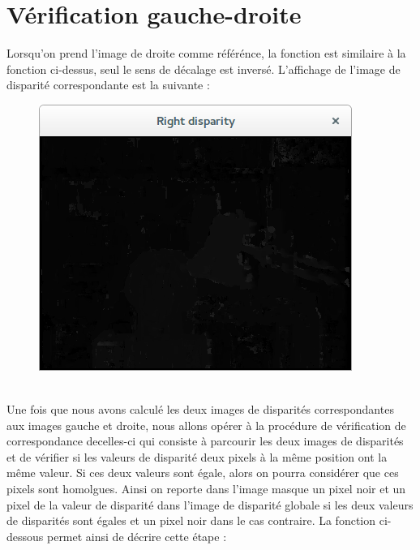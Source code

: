 \documentclass[a4paper,12pt]{report}
\begin{document}
\section*{Vérification gauche-droite}
Lorsqu'on prend l'image de droite comme référénce, la fonction est similaire à la fonction ci-dessus, seul le sens de décalage est inversé. L'affichage de l'image de disparité correspondante est la suivante :
\begin{figure}[!ht]
	\center \includegraphics[scale=0.5]{./image/rd.png}
\end{figure} \\
Une fois que nous avons calculé les deux images de disparités correspondantes aux images gauche et droite, nous allons opérer à la procédure de vérification de correspondance decelles-ci qui consiste à parcourir les deux images de disparités et de vérifier si les valeurs de disparité deux pixels à la même position ont la même valeur. Si ces deux valeurs sont égale, alors on pourra considérer que ces pixels sont homolgues. Ainsi on reporte dans l'image masque un pixel noir et un pixel de la valeur de disparité dans l'image de disparité globale si les deux valeurs de disparités sont égales et un pixel noir dans le cas contraire. La fonction ci-dessous permet ainsi de décrire cette étape : 
\newpage
\end{document}
